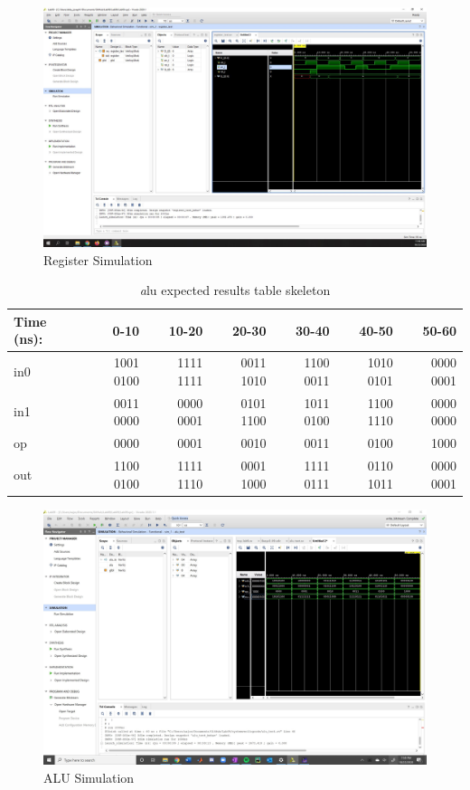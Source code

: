\documentclass[11pt]{article}
\begin{document}
\begin{figure}[ht] \centering	
	\includegraphics[width=1\textwidth,trim=21cm 19cm 0cm 6cm,clip]{register_test_scrn}
	\caption{Register Simulation}
	\label{fig:img1}
\end{figure}

\begin{table}[ht]\centering
	\caption{\textit alu expected results table skeleton}
	\label{ALU:tbl:alu_ERT}\medskip
	\begin{tabular}{l|rrrrrr}
		Time (ns): & 0-10 & 10-20 & 20-30 & 30-40 & 40-50 & 50-60 \\
		\midrule
		in0 & 1001 0100 & 1111 1111 & 0011 1010 & 1100 0011 & 1010 0101 & 0000 0001 \\
		in1 & 0011 0000 & 0000 0001 & 0101 1100 & 1011 0100 & 1100 1110 & 0000 0000 \\
		op	& 0000 & 0001 & 0010 & 0011 & 0100 & 1000 \\
		\midrule
		out & 1100 0100 & 1111 1110 & 0001 1000 & 1111 0111 & 0110 1011 & 0000 0001 \\
		\bottomrule
	\end{tabular}
\end{table}

\begin{figure}[ht] \centering	
	\includegraphics[width=1\textwidth,trim=19cm 15cm 0cm 6cm,clip]{alu_test_scrn}
	\caption{ALU Simulation}
	\label{fig:img2}
\end{figure}
\end{document}
